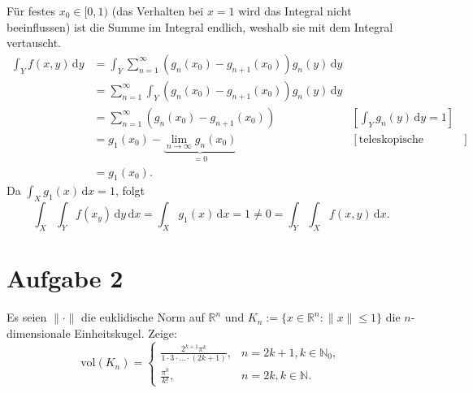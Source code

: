 \documentclass[10pt]{article}\usepackage[]{graphicx}\usepackage[]{color}
\newcommand{\N}{\mathbb{N}}
\newcommand{\R}{\mathbb{R}}
\newcommand{\df}{\,\textrm{d}}
\begin{document}
Für festes $x_0 \in [0,1)$ (das Verhalten bei $x = 1$
wird das Integral nicht beeinflussen) ist die Summe im Integral endlich,
weshalb sie mit dem Integral vertauscht.
\begin{align*}
 \int_Y f(x,y) \df y
 &= \int_Y \sum_{n=1}^{\infty} (g_n(x_0)-g_{n+1}(x_0))g_n(y) \df y &\\
 &= \sum_{n=1}^{\infty} \int_Y (g_n(x_0)-g_{n+1}(x_0))g_n(y) \df y &\\
 &= \sum_{n=1}^{\infty} (g_n(x_0)-g_{n+1}(x_0)) & [\int_Y g_n(y) \df y = 1] \\
 &= g_1(x_0) - \underbrace{\lim_{n \to \infty} g_n(x_0)}_{= 0} & [\textrm{teleskopische Summe}] \\
 &= g_1(x_0). &
\end{align*}
Da $\int_X g_1(x) \df x = 1$, folgt
\[
  \int_X \int_Y f(x_y) \df y \df x = \int_X g_1(x) \df x = 1 \neq 0 =  \int_Y \int_X f(x,y) \df x.
\]

\section*{Aufgabe 2}
Es seien $\|\cdot\|$ die euklidische Norm auf $\R^n$
und $K_n := \{x \in \R^n : \|x\| \leq 1\}$
die $n$-dimensionale Einheitskugel. Zeige:
\[
  \textrm{vol}(K_n) = 
  \begin{cases}
    \frac{2^{k+1}\pi^k}{1\cdot 3 \cdot \dots \cdot (2k+1)}, & n = 2k+1, k \in \N_0,\\
    \frac{\pi^k}{k!}, & n = 2k, k \in \N.
  \end{cases}
\]
\end{document}
